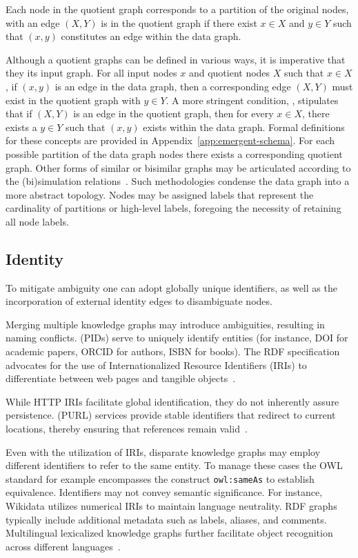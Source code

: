 Each node in the quotient graph corresponds to a partition of the original nodes, with an edge $(X,Y)$ is in the quotient graph if there exist $x\in X$ and $y\in Y$ such that $(x,y)$ constitutes an edge within the data graph.

Although a quotient graphs can be defined in various ways, it is imperative that they  its input graph. For all input nodes $x$ and quotient nodes $X$ such that $x\in X$, if $(x,y)$ is an edge in the data graph, then a corresponding edge $(X,Y)$ must exist in the quotient graph with $y\in Y$. A more stringent condition, , stipulates that if $(X,Y)$ is an edge in the quotient graph, then for every $x\in X$, there exists a $y\in Y$ such that $(x,y)$ exists within the data graph. Formal definitions for these concepts are provided in Appendix~\ref{app:emergent-schema}.
For each possible partition of the data graph nodes there exists a  corresponding quotient graph. Other forms of similar or bisimilar graphs may be articulated according to the (bi)simulation relations~\cite{Cebiric2019SummarizingSemanticGraphs}. Such methodologies condense the data graph into a more abstract topology. Nodes may be assigned labels that represent the cardinality of partitions or high-level labels, foregoing the necessity of retaining all node labels.

\subsection{Identity}\label{identity}
To mitigate ambiguity one can adopt globally unique identifiers, as well as the incorporation of external identity edges to disambiguate nodes.

Merging multiple knowledge graphs may introduce ambiguities, resulting in naming conflicts.  (PIDs) serve to uniquely identify entities (for instance, DOI for academic papers, ORCID for authors, ISBN for books). The RDF specification advocates for the use of Internationalized Resource Identifiers (IRIs) to differentiate between web pages and tangible objects~\cite{Hakala2010PIDs}.

While HTTP IRIs facilitate global identification, they do not inherently assure persistence.  (PURL) services provide stable identifiers that redirect to current locations, thereby ensuring that references remain valid~\cite{BernersLee2006LinkedData}\cite{Heath2011LinkedData}.

Even with the utilization of IRIs, disparate knowledge graphs may employ different identifiers to refer to the same entity. To manage these cases the OWL standard for example encompasses the construct \texttt{owl:sameAs} to establish equivalence.
Identifiers may not convey semantic significance. For instance, Wikidata utilizes numerical IRIs to maintain language neutrality. RDF graphs typically include additional metadata such as labels, aliases, and comments. Multilingual lexicalized knowledge graphs further facilitate object recognition across different languages~\cite{DeMelo2015Lexvo.org, MartinezRodriguez2020InformationExtractionMeetsSemanticWeb}.  


